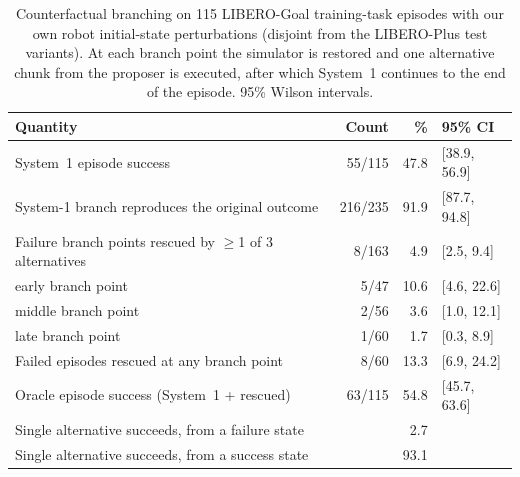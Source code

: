 \begin{table}[t]
\centering
\caption{Counterfactual branching on 115 LIBERO-Goal training-task episodes with our own robot initial-state perturbations (disjoint from the LIBERO-Plus test variants). At each branch point the simulator is restored and one alternative chunk from the proposer is executed, after which System~1 continues to the end of the episode. 95\% Wilson intervals.}
\label{tab:headroom}
\small
\begin{tabular}{lrrl}
\toprule
Quantity & Count & \% & 95\% CI \\
\midrule
System~1 episode success & 55/115 & 47.8 & [38.9, 56.9] \\
System-1 branch reproduces the original outcome & 216/235 & 91.9 & [87.7, 94.8] \\
Failure branch points rescued by $\geq$1 of 3 alternatives & 8/163 & 4.9 & [2.5, 9.4] \\
\quad early branch point & 5/47 & 10.6 & [4.6, 22.6] \\
\quad middle branch point & 2/56 & 3.6 & [1.0, 12.1] \\
\quad late branch point & 1/60 & 1.7 & [0.3, 8.9] \\
Failed episodes rescued at any branch point & 8/60 & 13.3 & [6.9, 24.2] \\
Oracle episode success (System~1 + rescued) & 63/115 & 54.8 & [45.7, 63.6] \\
Single alternative succeeds, from a failure state & & 2.7 & \\
Single alternative succeeds, from a success state & & 93.1 & \\
\bottomrule
\end{tabular}
\end{table}
